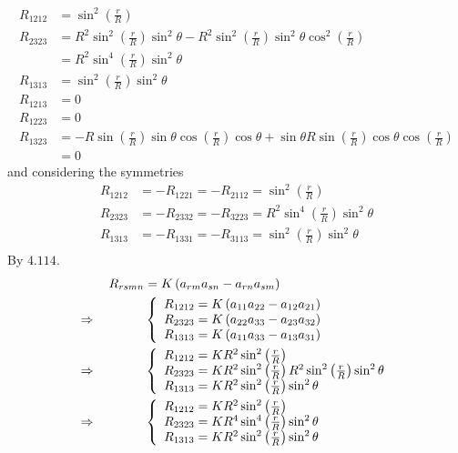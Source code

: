 \begin{align}
R_{1212}&=
\sin^2\left(\frac{r}{R}\right)\\
R_{2323}&=
R^2\sin^2\left(\frac{r}{R}\right)\sin^2\theta 
-R^2\sin^2\left(\frac{r}{R}\right)\sin^2\theta\cos^2\left(\frac{r}{R}\right)\\
&= R^2\sin^4\left(\frac{r}{R}\right)\sin^2\theta\\
R_{1313}&=\sin^2\left(\frac{r}{R}\right)\sin^2\theta\\
R_{1213}&=0\\
R_{1223}&=0\\
R_{1323}&=
-R\sin\left(\frac{r}{R}\right)\sin\theta\cos\left(\frac{r}{R}\right)\cos\theta+\sin\theta R\sin\left(\frac{r}{R}\right)\cos\theta\cos\left(\frac{r}{R}\right)\\&=0
\end{align}
and considering the symmetries
\begin{align}
R_{1212}&=-R_{1221}=-R_{2112}=
\sin^2\left(\frac{r}{R}\right)\\
R_{2323}&=-R_{2332}=-R_{3223}= R^2\sin^4\left(\frac{r}{R}\right)\sin^2\theta\\
R_{1313}&=-R_{1331}=-R_{3113}=\sin^2\left(\frac{r}{R}\right)\sin^2\theta\\
\end{align}
By $\mathbf{4.114.}$
\begin{align}
R_{rsmn}&= K\left(a_{rm}a_{sn}-a_{rn}a_{sm}\right)\\
\Rightarrow\quad\quad\quad\quad &\left\{\begin{array}{l}
R_{1212}= K\left(a_{11}a_{22}-a_{12}a_{21}\right)\\
R_{2323}= K\left(a_{22}a_{33}-a_{23}a_{32}\right)\\
R_{1313}= K\left(a_{11}a_{33}-a_{13}a_{31}\right)
\end{array}\right.\\
\Rightarrow\quad\quad\quad\quad &\left\{\begin{array}{l}
R_{1212}= K R^2\sin^2\left(\frac{r}{R}\right)\\
R_{2323}= K R^2\sin^2\left(\frac{r}{R}\right)R^2\sin^2\left(\frac{r}{R}\right)\sin^2\theta\\
R_{1313}= K R^2\sin^2\left(\frac{r}{R}\right)\sin^2\theta\\
\end{array}\right.\\
\Rightarrow\quad\quad\quad\quad &\left\{\begin{array}{l}
R_{1212}= K R^2\sin^2\left(\frac{r}{R}\right)\\
R_{2323}= K R^4\sin^4\left(\frac{r}{R}\right)\sin^2\theta\\
R_{1313}= K R^2\sin^2\left(\frac{r}{R}\right)\sin^2\theta\\
\end{array}\right.
\end{align}
